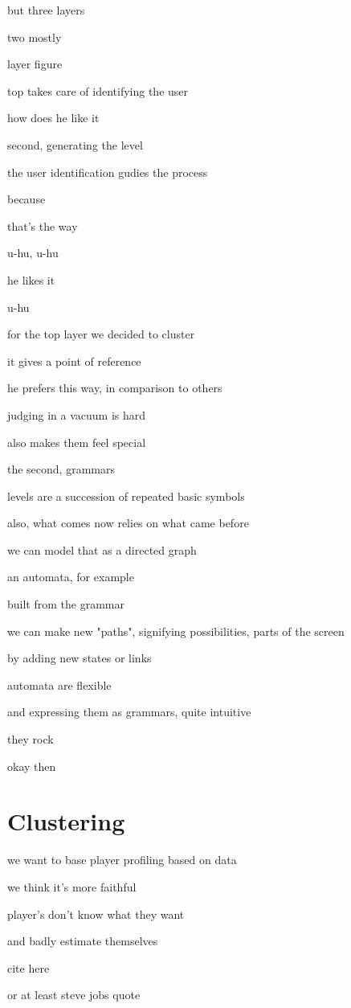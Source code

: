 \documentclass[conference]{IEEEtran}
\begin{document}
but three layers

two mostly

layer figure

top takes care of identifying the user

how does he like it

second, generating the level

the user identification gudies the process

because

that's the way

u-hu, u-hu

he likes it

u-hu

for the top layer we decided to cluster

it gives a point of reference

he prefers this way, in comparison to others

judging in a vacuum is hard

also makes them feel special

the second, grammars

levels are a succession of repeated basic symbols

also, what comes now relies on what came before

we can model that as a directed graph

an automata, for example

built from the grammar

we can make new "paths", signifying possibilities, parts of the screen

by adding new states or links

automata are flexible

and expressing them as grammars, quite intuitive

they rock

okay then

\section{Clustering}

we want to base player profiling based on data

we think it's more faithful

player's don't know what they want

and badly estimate themselves

cite here

or at least steve jobs quote
\end{document}
